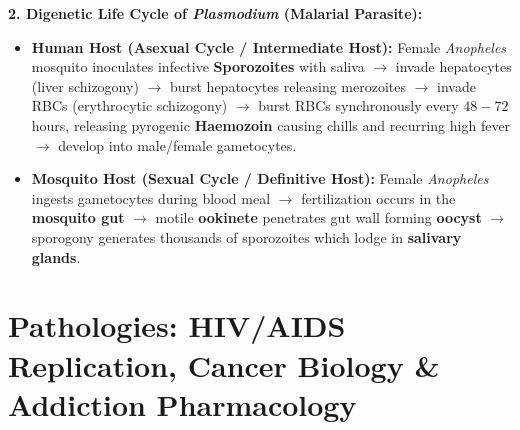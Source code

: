 \documentclass[10pt,twoside,openright]{book}
\begin{document}
\begin{conceptbox}
\textbf{2. Digenetic Life Cycle of \textit{Plasmodium} (Malarial Parasite):}
\begin{itemize}
  \item \textbf{Human Host (Asexual Cycle / Intermediate Host):} Female \textit{Anopheles} mosquito inoculates infective \textbf{Sporozoites} with saliva $\to$ invade hepatocytes (liver schizogony) $\to$ burst hepatocytes releasing merozoites $\to$ invade RBCs (erythrocytic schizogony) $\to$ burst RBCs synchronously every $48-72$ hours, releasing pyrogenic \textbf{Haemozoin} causing chills and recurring high fever $\to$ develop into male/female gametocytes.
  \item \textbf{Mosquito Host (Sexual Cycle / Definitive Host):} Female \textit{Anopheles} ingests gametocytes during blood meal $\to$ fertilization occurs in the \textbf{mosquito gut} $\to$ motile \textbf{ookinete} penetrates gut wall forming \textbf{oocyst} $\to$ sporogony generates thousands of sporozoites which lodge in \textbf{salivary glands}.
\end{itemize}
\end{conceptbox}

\section{Pathologies: HIV/AIDS Replication, Cancer Biology \& Addiction Pharmacology}
\end{document}
